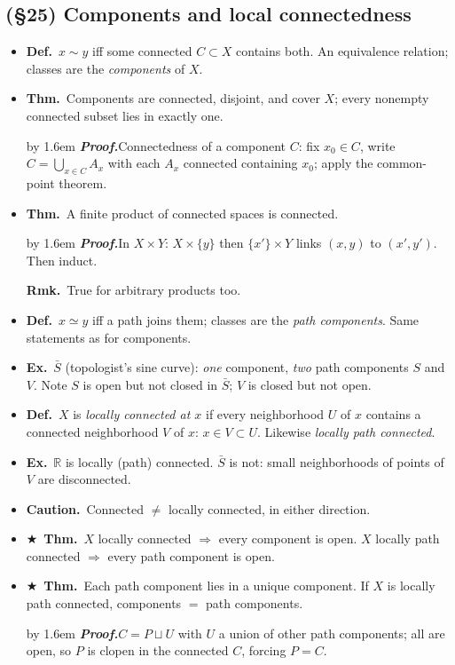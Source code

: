 \documentclass[12pt,a4paper]{article}
\newcommand{\Dfn}{\textbf{Def.}~}
\newcommand{\Thm}{\textbf{Thm.}~}
\newcommand{\Exa}{\textbf{Ex.}~}
\newcommand{\Rmk}{\textbf{Rmk.}~}
\newcommand{\Warn}{\textbf{Caution.}~}
\newcommand{\Key}{$\bigstar$~}                  %
\newcommand{\Pf}[1]{%
  \par\addvspace{7pt}\nopagebreak
  \begingroup
    \advance\leftskip by 1.6em
    \parindent=0pt \small\color{prf}%
    \textbf{\textit{Proof.}}\enspace #1\par
  \endgroup
  \addvspace{9pt}}
\newenvironment{BL}%
  {\begin{itemize}[leftmargin=1.4em,labelsep=0.55em,itemsep=11pt,topsep=11pt,parsep=0pt]}%
  {\end{itemize}}
\newcommand{\RR}{\mathbb{R}}
\newcommand{\imp}{\Rightarrow}
\begin{document}
\subsection{(\S25) Components and local connectedness}

\begin{BL}
\item \Dfn $x\sim y$ iff some connected $C\subset X$ contains both. An equivalence relation;
      classes are the \emph{components} of $X$.
\item \Thm Components are connected, disjoint, and cover $X$; every nonempty connected
      subset lies in exactly one.
\Pf{Connectedness of a component $C$: fix $x_0\in C$, write $C=\bigcup_{x\in C}A_x$ with each
$A_x$ connected containing $x_0$; apply the common-point theorem.}
\item \Thm A finite product of connected spaces is connected.
\Pf{In $X\times Y$: $X\times\{y\}$ then $\{x'\}\times Y$ links $(x,y)$ to $(x',y')$.
Then induct.}
      \Rmk True for arbitrary products too.
\item \Dfn $x\simeq y$ iff a path joins them; classes are the \emph{path components}.
      Same statements as for components.
\item \Exa $\bar S$ (topologist's sine curve): \emph{one} component, \emph{two} path components
      $S$ and $V$. Note $S$ is open but not closed in $\bar S$; $V$ is closed but not open.
\item \Dfn $X$ is \emph{locally connected at $x$} if every neighborhood $U$ of $x$ contains a
      connected neighborhood $V$ of $x$: $x\in V\subset U$. Likewise
      \emph{locally path connected}.
\item \Exa $\RR$ is locally (path) connected.
      $\bar S$ is not: small neighborhoods of points of $V$ are disconnected.
\item \Warn Connected $\neq$ locally connected, in either direction.
\item \Key\Thm $X$ locally connected $\imp$ every component is open.
      $X$ locally path connected $\imp$ every path component is open.
\item \Key\Thm Each path component lies in a unique component. If $X$ is locally path connected,
      components $=$ path components.
\Pf{$C=P\sqcup U$ with $U$ a union of other path components; all are open,
so $P$ is clopen in the connected $C$, forcing $P=C$.}
\end{BL}
\end{document}
